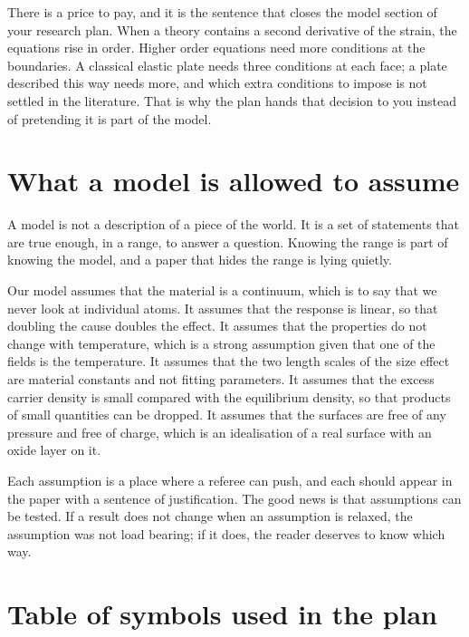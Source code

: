 \documentclass[11pt]{article}
\begin{document}
There is a price to pay, and it is the sentence that closes the model section of your research plan. When a
theory contains a second derivative of the strain, the equations rise in order. Higher order equations need
more conditions at the boundaries. A classical elastic plate needs three conditions at each face; a plate
described this way needs more, and which extra conditions to impose is not settled in the literature. That is
why the plan hands that decision to you instead of pretending it is part of the model.

\section{What a model is allowed to assume}

A model is not a description of a piece of the world. It is a set of statements that are true enough, in a
range, to answer a question. Knowing the range is part of knowing the model, and a paper that hides the range
is lying quietly.

Our model assumes that the material is a continuum, which is to say that we never look at individual atoms.
It assumes that the response is linear, so that doubling the cause doubles the effect. It assumes that the
properties do not change with temperature, which is a strong assumption given that one of the fields is the
temperature. It assumes that the two length scales of the size effect are material constants and not fitting
parameters. It assumes that the excess carrier density is small compared with the equilibrium density, so
that products of small quantities can be dropped. It assumes that the surfaces are free of any pressure and
free of charge, which is an idealisation of a real surface with an oxide layer on it.

Each assumption is a place where a referee can push, and each should appear in the paper with a sentence of
justification. The good news is that assumptions can be tested. If a result does not change when an
assumption is relaxed, the assumption was not load bearing; if it does, the reader deserves to know which way.

\section{Table of symbols used in the plan}
\end{document}
